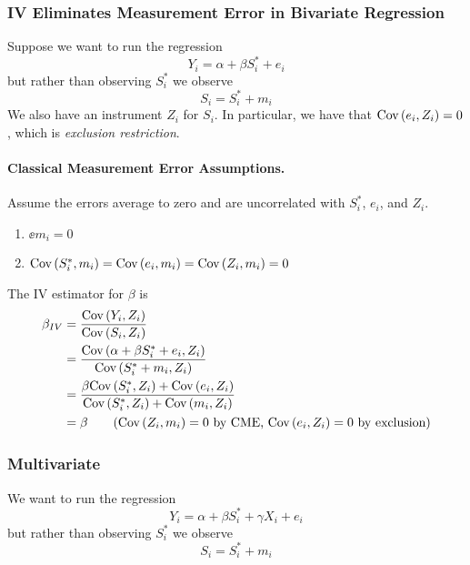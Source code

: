 \documentclass[11pt]{article}
\begin{document}
\subsubsection{IV Eliminates Measurement Error in Bivariate Regression}

Suppose we want to run the regression
\begin{equation}
	Y_i = \alpha + \beta S_i^* + e_i
\end{equation}
but rather than observing $S_i^*$ we observe
\begin{equation}
	S_i = S_i^* + m_i
\end{equation}
We also have an instrument $Z_i$ for $S_i$. In particular, we have that $\text{Cov}\left( e_i, Z_i \right) = 0$, which is \emph{exclusion restriction}.

\paragraph*{Classical Measurement Error Assumptions.} Assume the errors average to zero and are uncorrelated with $S_i^*$, $e_i$, and $Z_i$. 
\begin{enumerate}
	\item $\ee{m_i} = 0$ 
	\item $\text{Cov}\left( S^*_i,m_i \right) = \text{Cov}\left( e_i,m_i \right) = \text{Cov}\left( Z_i, m_i \right) = 0$
\end{enumerate}

The IV estimator for $\beta$ is
\begin{align*}
	\beta_{IV} &= \frac{\cov{Y_i, Z_i}}{\cov{S_i, Z_i}} \\
	&= \frac{\cov{\alpha + \beta S_i^* + e_i, Z_i}}{\cov{S_i^* + m_i, Z_i}} \\
	&= \frac{\beta \cov{S^*_i, Z_i} + \cov{e_i, Z_i}}{\cov{S^*_i, Z_i} + \cov{m_i, Z_i}} \\
	&= \beta \tag{$\cov{Z_i, m_i} = 0$ by CME, $\cov{e_i,Z_i} = 0$ by exclusion}
\end{align*}



\subsubsection{Multivariate}

We want to run the regression
\begin{equation}
	Y_i = \alpha + \beta S_i^* + \gamma X_i + e_i
\end{equation}
but rather than observing $S_i^*$ we observe
\begin{equation}
	S_i = S_i^* + m_i
\end{equation}
\end{document}

